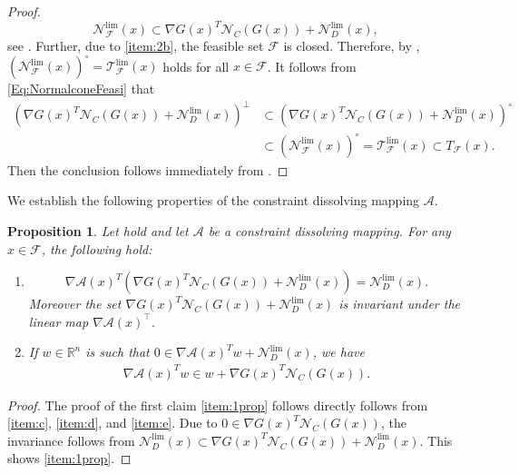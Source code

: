\documentclass[11pt,a4paper,reqno]{amsart}
\newtheorem{proposition}[theorem]{Proposition}
\begin{document}
{\begin{proof}
\begin{equation}
    \mathcal N^{\text{lim}}_{\mathcal F}(x) \subset \nabla G(x)^T\mathcal N_C(G(x))+\mathcal N_D^{\text{lim}}(x),
\end{equation}
see \cite[Theorem~3.16]{mehlitz2020asymptotic}. Further, due to  \ref{item:2b}, the feasible set $\mathcal F$ is closed. Therefore, by \cite[Theorem~6.8~(b)]{rockafellar1998variational}, $\left(\mathcal N^{\text{lim}}_{\mathcal F}(x)\right)^{\circ}=\mathcal T^{\text{lim}}_{\mathcal F}(x)$ holds for all $x\in \mathcal F$. It follows from \eqref{Eq:NormalconeFeasi} that
    \begin{equation*}
    \begin{aligned}
        \left(\nabla G(x)^T\mathcal N_C(G(x))+\mathcal N_D^{\text{lim}}(x)\right)^{\perp} &\subset \left(\nabla G(x)^T\mathcal N_C(G(x))+\mathcal N_D^{\text{lim}}(x)\right)^{\circ} \\
        & \subset \left(\mathcal N^{\text{lim}}_{\mathcal F}(x)\right)^{\circ}=\mathcal T^{\text{lim}}_{\mathcal F}(x) \subset T_{\mathcal F}(x).
        \end{aligned}
    \end{equation*}
    Then the conclusion follows immediately from .
\end{proof}




We establish the following properties of the constraint dissolving mapping $\mathcal A$.

\begin{proposition}\label{Prop:nablaA}
   Let  hold and let $\mathcal A$ be a constraint dissolving mapping. For any $x\in \mathcal F$, the following hold:
   \begin{enumerate}[label=(\arabic*)]
       \item \label{item:1prop} 
\begin{equation}\label{Eq:conesconstraintdis}
    \nabla \mathcal A (x)^T\left(\nabla G(x)^T \mathcal N_C (G(x))+\mathcal N^{\text{lim}}_D(x) \right)=\mathcal N^{\text{lim}}_D(x).
\end{equation}
Moreover the set $\nabla G(x)^T\mathcal N_C(G(x))+\mathcal N_D^{\text{lim}}(x)$ is invariant under the linear map $\nabla \mathcal A(x)^\top$.
\item \label{item:2prop} If $w\in \mathbb R^n$ is such that  $0\in \nabla \mathcal A(x)^Tw+ \mathcal N_D^{\text{lim}}(x)$, we have
\begin{align}\label{Item:squaretoD_2} 
           \nabla \mathcal A(x)^T w\in w +\nabla G(x)^T \mathcal N_C (G(x)).
       \end{align}
   \end{enumerate}
\end{proposition}
\begin{proof}
The proof of the first claim \ref{item:1prop} follows directly follows from  \ref{item:c}, \ref{item:d}, and \ref{item:e}. Due to $0\in \nabla G(x)^T\mathcal N_C(G(x))$, the invariance follows from $\mathcal N^{\text{lim}}_D(x) \subset \nabla G(x)^T\mathcal N_C(G(x))+\mathcal N_D^{\text{lim}}(x)$. This shows \ref{item:1prop}.


\end{proof}}
\end{document}
